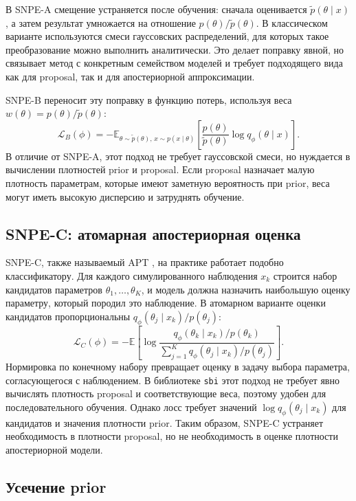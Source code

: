 В SNPE-A \cite{papamakarios2016fast} смещение устраняется после обучения: сначала оценивается
$\tilde p(\theta\mid x)$, а затем результат умножается на отношение
$p(\theta)/\tilde p(\theta)$. В классическом варианте используются
смеси гауссовских распределений, для которых такое преобразование можно
выполнить аналитически. Это делает поправку явной, но связывает метод
с конкретным семейством моделей и требует подходящего вида как для
proposal, так и для апостериорной аппроксимации.

SNPE-B \cite{lueckmann2017flexible} переносит эту поправку в функцию потерь, используя веса
$w(\theta)=p(\theta)/\tilde p(\theta)$:
\[
\mathcal L_B(\phi)=
-\mathbb E_{\theta\sim\tilde p(\theta),\,x\sim p(x\mid\theta)}
\left[
\frac{p(\theta)}{\tilde p(\theta)}
\log q_\phi(\theta\mid x)
\right].
\]
В отличие от SNPE-A, этот подход не требует гауссовской смеси, но
нуждается в вычислении плотностей prior и proposal. Если proposal
назначает малую плотность параметрам, которые имеют заметную вероятность
при prior, веса могут иметь высокую дисперсию и затруднять обучение.

\subsection{SNPE-C: атомарная апостериорная оценка}

SNPE-C, также называемый APT \cite{greenberg2019apt}, на практике работает подобно классификатору.
Для каждого симулированного наблюдения $x_k$ строится набор
кандидатов параметров $\theta_1,\ldots,\theta_K$, и модель должна
назначить наибольшую оценку параметру, который породил это наблюдение.
В атомарном варианте оценки кандидатов пропорциональны
$q_\phi(\theta_j\mid x_k)/p(\theta_j)$:
\[
\mathcal L_C(\phi)=
-\mathbb E\left[
\log
\frac{q_\phi(\theta_k\mid x_k)/p(\theta_k)}
{\displaystyle\sum_{j=1}^{K}
q_\phi(\theta_j\mid x_k)/p(\theta_j)}
\right].
\]
Нормировка по конечному набору превращает оценку в задачу выбора
параметра, согласующегося с наблюдением. В библиотеке \texttt{sbi} этот подход
не требует явно вычислять плотность proposal и соответствующие веса,
поэтому удобен для последовательного обучения.
Однако лосс требует значений $\log q_\phi(\theta_j\mid x_k)$
для кандидатов и значения плотности prior. Таким образом, SNPE-C
устраняет необходимость в плотности proposal, но не необходимость в
оценке плотности апостериорной модели.

\subsection{Усечение prior}

